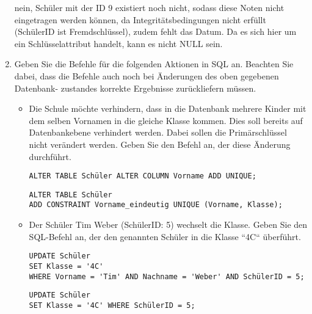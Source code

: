 \documentclass{lehramt-informatik-aufgabe}
\begin{document}
\begin{enumerate}
\begin{antwort}[muster]
nein, Schüler mit der ID 9 existiert noch nicht, sodass diese Noten
nicht eingetragen werden können, da Integritätsbedingungen nicht erfüllt
(SchülerID ist Fremdschlüssel), zudem fehlt das Datum. Da es sich
hier um ein Schlüsselattribut handelt, kann es nicht NULL sein.
\end{antwort}


\item Geben Sie die Befehle für die folgenden Aktionen in SQL an.
Beachten Sie dabei, dass die Befehle auch noch bei Änderungen des oben
gegebenen Datenbank- zustandes korrekte Ergebnisse zurückliefern müssen.

\begin{itemize}
\item Die Schule möchte verhindern, dass in die Datenbank mehrere Kinder
mit dem selben Vornamen in die gleiche Klasse kommen. Dies soll bereits
auf Datenbankebene verhindert werden. Dabei sollen die Primärschlüssel
nicht verändert werden. Geben Sie den Befehl an, der diese Änderung
durchführt.

\begin{antwort}[falsch]
\begin{verbatim}
ALTER TABLE Schüler ALTER COLUMN Vorname ADD UNIQUE;
\end{verbatim}
\end{antwort}

\begin{antwort}[muster]
\begin{verbatim}
ALTER TABLE Schüler
ADD CONSTRAINT Vorname_eindeutig UNIQUE (Vorname, Klasse);
\end{verbatim}
\end{antwort}

\item Der Schüler Tim Weber (SchülerID: 5) wechselt die Klasse. Geben
Sie den SQL-Befehl an, der den genannten Schüler in die Klasse “4C“
überführt.

\begin{antwort}[richtig]
\begin{verbatim}
UPDATE Schüler
SET Klasse = '4C'
WHERE Vorname = 'Tim' AND Nachname = 'Weber' AND SchülerID = 5;
\end{verbatim}
\end{antwort}

\begin{antwort}[muster]
\begin{verbatim}
UPDATE Schüler
SET Klasse = '4C' WHERE SchülerID = 5;
\end{verbatim}
\end{antwort}


\end{itemize}
\end{enumerate}
\end{document}
